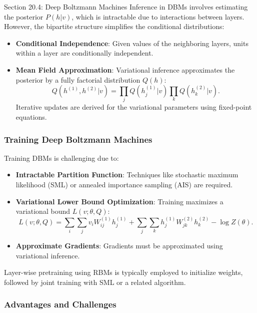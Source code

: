 \begin{notes}{Section 20.4: Deep Boltzmann Machines}
    Inference in DBMs involves estimating the posterior $P(h | v)$, which is intractable due to interactions between layers. However, the bipartite structure simplifies the conditional distributions:
    \begin{itemize}
        \item \textbf{Conditional Independence}: Given values of the neighboring layers, units within a layer are conditionally independent.
        \item \textbf{Mean Field Approximation}: Variational inference approximates the posterior by a fully factorial distribution $Q(h)$:
        \[
        Q(h^{(1)}, h^{(2)} | v) = \prod_j Q(h_j^{(1)} | v) \prod_k Q(h_k^{(2)} | v).
        \]
        Iterative updates are derived for the variational parameters using fixed-point equations.
    \end{itemize}
    
    \subsubsection*{Training Deep Boltzmann Machines}
    
    Training DBMs is challenging due to:
    \begin{itemize}
        \item \textbf{Intractable Partition Function}: Techniques like stochastic maximum likelihood (SML) or annealed importance sampling (AIS) are required.
        \item \textbf{Variational Lower Bound Optimization}: Training maximizes a variational bound $L(v; \theta, Q)$:
        \[
        L(v; \theta, Q) = \sum_i \sum_j v_i W_{ij}^{(1)} h_j^{(1)} + \sum_j \sum_k h_j^{(1)} W_{jk}^{(2)} h_k^{(2)} - \log Z(\theta).
        \]
        \item \textbf{Approximate Gradients}: Gradients must be approximated using variational inference.
    \end{itemize}
    
    Layer-wise pretraining using RBMs is typically employed to initialize weights, followed by joint training with SML or a related algorithm.
    
    \subsubsection*{Advantages and Challenges}
    

\end{notes}
